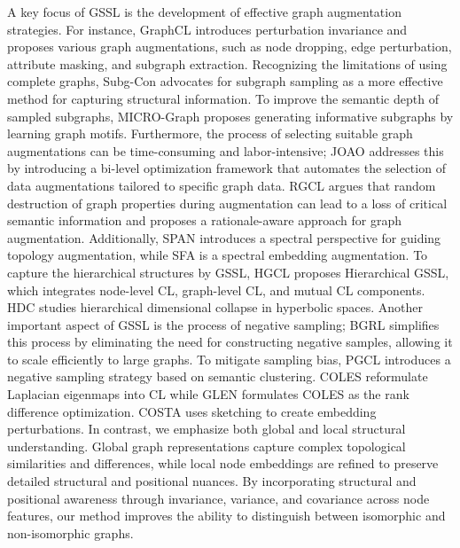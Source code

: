 A key focus of GSSL is the development of effective graph augmentation strategies. For instance, GraphCL \cite{you2020graph} introduces perturbation invariance and proposes various graph augmentations, such as node dropping, edge perturbation, attribute masking, and subgraph extraction. Recognizing the limitations of using complete graphs, Subg-Con \cite{jiao2020sub} advocates for subgraph sampling as a more effective method for capturing structural information. To improve the semantic depth of sampled subgraphs, MICRO-Graph \cite{zhang2020motif} proposes generating informative subgraphs by learning graph motifs. Furthermore, the process of selecting suitable graph augmentations can be time-consuming and labor-intensive; JOAO \cite{you2021graph} addresses this by introducing a bi-level optimization framework that automates the selection of data augmentations tailored to specific graph data. RGCL \cite{li2022let} argues that random destruction of graph properties during augmentation can lead to a loss of critical semantic information and proposes a rationale-aware approach for graph augmentation. Additionally, SPAN \cite{linspectral} introduces a spectral perspective for guiding topology augmentation,
while SFA \cite{zhang2023spectral} is a spectral embedding augmentation. 
%
%
To capture the hierarchical structures by GSSL, HGCL \cite{ju2023unsupervised} proposes Hierarchical GSSL, which integrates node-level CL, graph-level CL, and mutual CL components. HDC \cite{hyper_collapse} studies hierarchical dimensional collapse in hyperbolic spaces. Another important aspect of GSSL is the process of negative sampling; BGRL \cite{thakoorlarge} simplifies this process by eliminating the need for constructing negative samples, allowing it to scale efficiently to large graphs. To mitigate sampling bias, PGCL \cite{lin2022prototypical} introduces a negative sampling strategy based on semantic clustering. 
COLES \cite{zhu2021contrastive} reformulate Laplacian eigenmaps into CL while GLEN \cite{glen} formulates COLES as the rank difference optimization. COSTA \cite{zhang2022costa} uses sketching to create embedding perturbations.
%
In contrast, we emphasize both global and local structural understanding. Global graph representations  capture complex topological similarities and differences, while local node embeddings are refined to preserve detailed structural and positional nuances. By incorporating structural and positional awareness through invariance, variance, and covariance across node features, our method improves the ability to distinguish between isomorphic and non-isomorphic graphs. %



